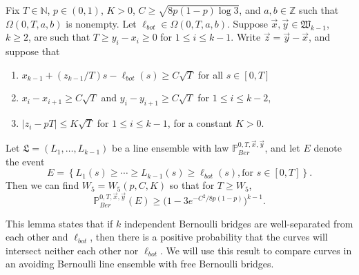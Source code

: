 \begin{lemma}\label{CurveSeparation} Fix $T\in\mathbb{N}$, $p\in (0,1)$, $K>0$, $C \geq \sqrt{8p(1-p)\log 3}$, and $a,b\in \mathbb{Z}$ such that $\Omega(0,T,a,b)$ is nonempty. Let $\ell_{bot} \in \Omega(0,T,a,b)$. Suppose $\vec{x},\vec{y}\in\mathfrak{W}_{k-1}$, $k\geq 2$, are such that $T \geq y_i - x_i \geq 0$ for $1\leq i\leq k-1$. Write $\vec{z} = \vec{y} - \vec{x}$, and suppose that
	\begin{enumerate}[label=(\arabic*)]
		
		\item $x_{k-1} + (z_{k-1}/T)s - \ell_{bot}(s) \geq C\sqrt{T}$ for all $s\in[0,T]$
		
		\item $x_i - x_{i+1} \geq C\sqrt{T}$ and $y_i - y_{i+1} \geq C\sqrt{T}$ for $1\leq i\leq k-2$,
		
		\item $|z_i - pT| \leq K\sqrt{T}$ for $1\leq i\leq k-1$, for a constant $K > 0$.
		
	\end{enumerate}
	Let $\mathfrak{L} = (L_1,\dots,L_{k-1})$ be a line ensemble with law $\mathbb{P}^{0,T,\vec{x},\vec{y}}_{Ber}$, and let $E$ denote the event 
	\[ E=\left\{L_1(s)\geq \cdots \geq L_{k-1}(s)\geq \ell_{bot}(s), \text{for } s\in [0,T]\right\}.
	\] Then we can find $W_5 = W_5(p,C,K)$ so that for $T\geq W_5$,
	\begin{equation}\label{SepBound}
	\mathbb{P}^{0,T,\vec{x},\vec{y}}_{Ber}(E) \geq \big(1 - 3e^{-C^2/8p(1-p)}\big)^{k-1}.
	\end{equation}
\end{lemma}

\begin{remark}
	This lemma states that if $k$ independent Bernoulli bridges are well-separated from each other and $\ell_{bot}$, then there is a positive probability that the curves will intersect neither each other nor $\ell_{bot}$. We will use this result to compare curves in an avoiding Bernoulli line ensemble with free Bernoulli bridges.
\end{remark}

